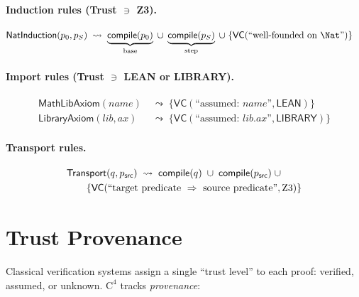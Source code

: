 \paragraph{Induction rules (Trust $\ni$ Z3).}

\begin{align}
  &\mathsf{NatInduction}(p_0, p_S)
  \;\leadsto\;
  \underbrace{\mathsf{compile}(p_0)}_\text{base}
  \;\cup\;
  \underbrace{\mathsf{compile}(p_S)}_\text{step}
  \;\cup\;
  \{\mathsf{VC}(\text{``well-founded on } \Nat\text{''})\}
\end{align}

\paragraph{Import rules (Trust $\ni$ LEAN or LIBRARY).}

\begin{align}
  \mathsf{MathLibAxiom}(\mathit{name}) &\;\leadsto\;
    \{\mathsf{VC}(\text{``assumed: } \mathit{name}\text{''}, \mathsf{LEAN})\}
  \\[4pt]
  \mathsf{LibraryAxiom}(\mathit{lib}, \mathit{ax}) &\;\leadsto\;
    \{\mathsf{VC}(\text{``assumed: } \mathit{lib}.\mathit{ax}\text{''},
    \mathsf{LIBRARY})\}
\end{align}

\paragraph{Transport rules.}

\begin{align}
  &\mathsf{Transport}(q, p_\mathsf{src}) \;\leadsto\;
  \mathsf{compile}(q) \;\cup\;
  \mathsf{compile}(p_\mathsf{src}) \;\cup\;
  \notag\\
  &\qquad \{\mathsf{VC}(\text{``target predicate } \Rightarrow
  \text{ source predicate''}, \text{Z3})\}
\end{align}


\section{Trust Provenance}
\label{sec:trust}

Classical verification systems assign a single ``trust level'' to
each proof: verified, assumed, or unknown.  $\mathrm{C}^4$
tracks \emph{provenance}:

